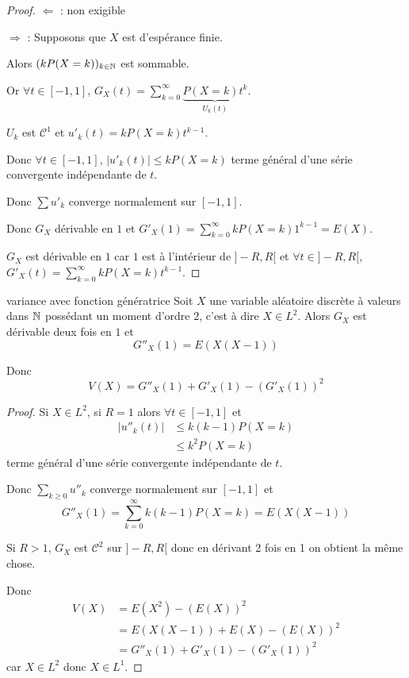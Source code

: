 \begin{proof}
    $\Leftarrow$ : non exigible 

    $\Rightarrow$ : Supposons que $X$ est d'espérance finie.
    

    Alors 
    $(k P(X = k))_{k \in \mathbb{N}}$ est sommable. 

    Or $\forall t \in [-1, 1]$, $G_X(t) = \sum_{k = 0}^{\infty} \underbrace{P(X = k) t^k}_{U_k(t)}$.

    $U_k$ est $\mathscr C^1$ et $u'_k(t) = k P(X = k) t^{k - 1}$.

    Donc $\forall t \in [-1, 1]$, $|u'_k(t)| \leqslant k P(X = k)$ terme général d'une série convergente 
    indépendante de $t$. 

    Donc $\sum u'_k$ converge normalement sur $[-1, 1]$.

    Donc $G_X$ dérivable en $1$ et $\displaystyle G'_X(1) = \sum_{k = 0}^{\infty} k P(X = k) 1^{k - 1} = E(X)$.


    $G_X$ est dérivable en $1$ car $1$ est à l'intérieur de $]-R, R[$
    et $\forall t \in ]-R, R[$, $\displaystyle G'_X(t) = \sum_{k = 0}^{\infty} k P(X = k) t^{k - 1}$.
\end{proof}

\begin{corollaire}{variance avec fonction génératrice}{}
    Soit $X$ une variable aléatoire discrète à  valeurs dans $\mathbb{N}$ possédant un moment 
    d'ordre $2$, c'est à dire $X \in L^2$. Alors 
    $G_X$ est dérivable deux fois en $1$ et
    $$ G''_X(1) = E(X(X - 1)) $$

    Donc $$ V(X) = G''_X(1) + G'_X(1) - (G'_X(1))^2 $$
\end{corollaire}

\begin{proof}
    Si $X \in L^2$, si $R = 1$ alors 
    $\forall t \in [-1, 1]$ et 
    \begin{align}
        |u''_k(t)| & \leqslant k(k - 1) P(X = k) \\
        & \leqslant k^2 P(X = k)
    \end{align}
    terme général d'une série convergente indépendante de $t$.

    Donc $\sum_{k \geqslant 0} u''_k$ converge normalement sur $[-1, 1]$ et 
    $$G''_X(1) = \sum_{k = 0}^{\infty} k (k - 1) P(X = k) = E(X(X - 1))$$

    Si $R > 1$, $G_X$ est $\mathscr C^2$ sur $]-R, R[$ donc en dérivant 2 fois en 1 on obtient 
    la même chose.

    Donc \begin{align}
        V(X) & = E(X^2) - (E(X))^2 \\
        & = E(X(X - 1)) + E(X) - (E(X))^2 \\
        & = G''_X(1) + G'_X(1) - (G'_X(1))^2
    \end{align}
    car $X \in L^2$ donc $X \in L^1$.
\end{proof}

